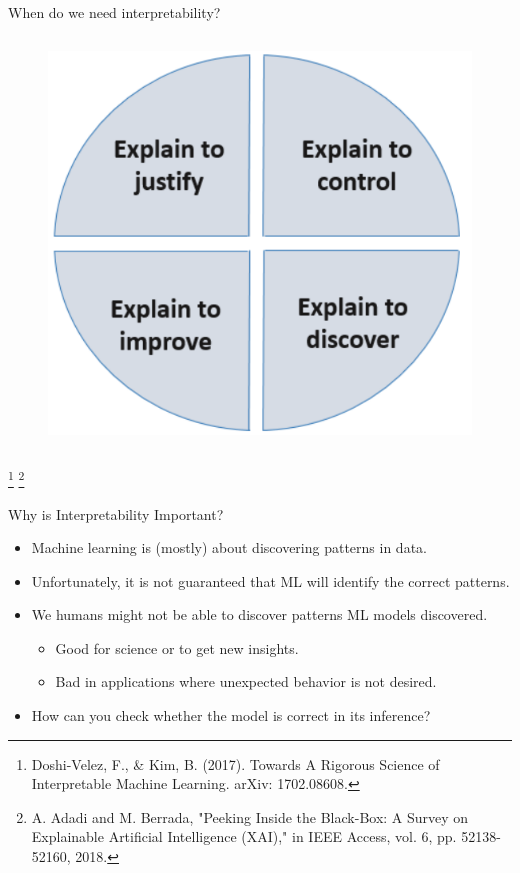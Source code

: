 \documentclass[11pt,compress,t,notes=noshow, xcolor=table]{beamer}
\begin{document}
\begin{vbframe}{When do we need interpretability?}
\begin{columns}
\begin{column}{0.4\textwidth}
\begin{center}
 \begin{figure}
  \includegraphics[width=\textwidth]{figure/explain-to}
 \end{figure}
 \end{center}
\end{column}
\end{columns}
     \lz
    \footnote[frame]{Doshi-Velez, F., \& Kim, B. (2017). Towards A Rigorous Science of Interpretable Machine Learning. arXiv: 1702.08608.}
    \footnote[frame]{A. Adadi and M. Berrada, "Peeking Inside the Black-Box: A Survey on Explainable Artificial Intelligence (XAI)," in IEEE Access, vol. 6, pp. 52138-52160, 2018.}
\end{vbframe}



\begin{vbframe}{Why is Interpretability Important?}
	
	\begin{itemize}
	    \item Machine learning is (mostly) about discovering patterns in data.
	    \medskip
	    \item Unfortunately, it is not guaranteed that ML will identify the correct patterns.
	    
	    \medskip
	    \item We humans might not be able to discover patterns ML models discovered.
	    \begin{itemize}
	        \item Good for science or to get new insights.
	        \item Bad in applications where unexpected behavior is not desired.
	    \end{itemize}
	    \medskip
	    
	    \item \alert{How can you check whether the model is correct in its inference?}
	\end{itemize}
	
\end{vbframe}
\end{document}
